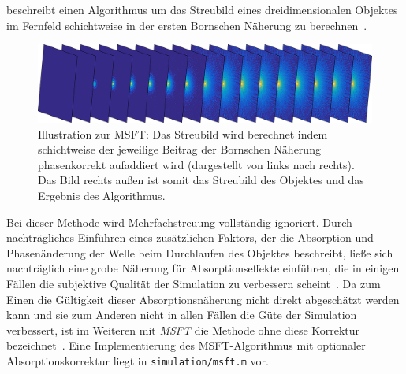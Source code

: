  beschreibt einen Algorithmus um das Streubild eines dreidimensionalen Objektes im Fernfeld schichtweise in der ersten Bornschen Näherung zu berechnen~\cite{barke2015}. 

\begin{figure}
	\centering
	\includegraphics[width=1\textwidth]{images/slice_msft.png}
	\caption[Illustration MSFT]{Illustration zur MSFT: Das Streubild wird berechnet indem schichtweise der jeweilige Beitrag der Bornschen Näherung phasenkorrekt aufaddiert wird (dargestellt von links nach rechts). Das Bild rechts außen ist somit das Streubild des Objektes und das Ergebnis des Algorithmus.}
	\label{fig:slice_msft}
\end{figure} 

Bei dieser Methode wird Mehrfachstreuung vollständig ignoriert. Durch nachträgliches Einführen eines zusätzlichen Faktors, der die Absorption und Phasenänderung der Welle beim Durchlaufen des Objektes beschreibt, ließe sich nachträglich eine grobe Näherung für Absorptionseffekte einführen, die in einigen Fällen die subjektive Qualität der Simulation zu verbessern scheint~\cite{barke2015}. Da zum Einen die Gültigkeit dieser Absorptionsnäherung nicht direkt abgeschätzt werden kann und sie zum Anderen nicht in allen Fällen die Güte der Simulation verbessert, ist im Weiteren mit \textit{MSFT} die Methode ohne diese Korrektur bezeichnet~\cite{fennel}.
Eine Implementierung des MSFT-Algorithmus mit optionaler Absorptionskorrektur liegt in \texttt{simulation/msft.m} vor. 


